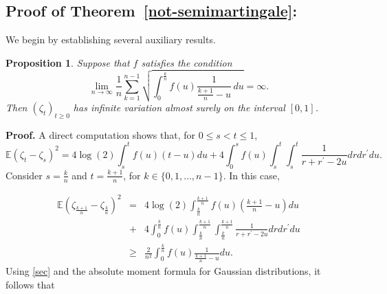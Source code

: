 \documentclass[preprint,12pt,authoryear]{elsarticle}
\def\E{\mathbb{E}}
\newtheorem{prop}{Proposition}
\begin{document}


\subsection*{Proof of Theorem~\ref{not-semimartingale}:} 
We begin by establishing several auxiliary results.


\begin{prop}\label{propA}
Suppose that \( f \) satisfies the condition
\begin{equation}\label{inf-var-condition}
   \lim_{n\rightarrow\infty} \frac{1}{n}\sum_{k=1}^{n-1} \sqrt{\int_0^{\frac{k}{n}} f(u)\frac{1}{\frac{k+1}{n}-u}\,du} = \infty.
\end{equation}
Then \( (\zeta_t)_{t \geq 0} \) has infinite variation almost surely on the interval \([0,1]\).
\end{prop}


\noindent\textbf{Proof.} A direct computation shows that, for \(0\le s<t\le 1\),
\begin{equation}\label{sec2}
        \E(\zeta_t-\zeta_s)^2 =4\log(2)\int_s^t f(u)(t-u)du+4\int_0^s f(u)\int_{s}^{t}\int_{s}^{t}\frac{1}{r+r^{'}-2u}drdr^{'}du.
   \end{equation}
Consider \(s = \frac{k}{n}\) and \(t = \frac{k+1}{n}\), for \(k \in \{0, 1, \ldots, n-1\}\). In this case,

\small
 \begin{eqnarray}\label{sec}
  \E\left(\zeta_{\frac{k+1}{n}}-\zeta_{\frac{k}{n}}\right)^2&=& 4\log(2)\int_{\frac{k}{n}}^{\frac{k+1}{n}} f(u)\left(\frac{k+1}{n}-u\right)du\\ \nonumber
       &+&4\int_0^{\frac{k}{n}} f(u)\int_{\frac{k}{n}}^{\frac{k+1}{n}}\int_{\frac{k}{n}}^{\frac{k+1}{n}}\frac{1}{r+r^{'}-2u}drdr^{'}du\\  \nonumber
       &\geq& \frac{2}{n^2} \int_0^\frac{k}{n} f(u)\frac{1}{\frac{k+1}{n}-u}du.
 \end{eqnarray}
Using \eqref{sec} and the absolute moment formula for Gaussian distributions, it follows that
\end{document}
